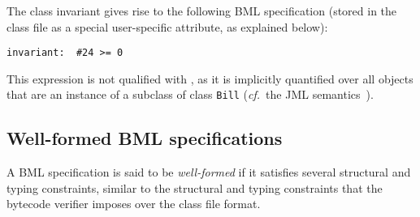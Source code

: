 The class invariant gives rise to the following BML specification
(stored in the class file as a special user-specific attribute, as
explained below):

\begin{verbatim}
invariant:  #24 >= 0
\end{verbatim}

This expression is not qualified with , as it is
implicitly quantified over all objects that are an instance of a
subclass of class \texttt{Bill} (\emph{cf.}\ the JML
semantics~\cite[\S 8.2]{JMLReferenceManual05}).


	



\subsection{Well-formed BML specifications}
A BML specification is said to be \emph{well-formed} if it satisfies
several structural and typing constraints, similar to the structural
and typing constraints that the bytecode verifier imposes over the
class file format.

